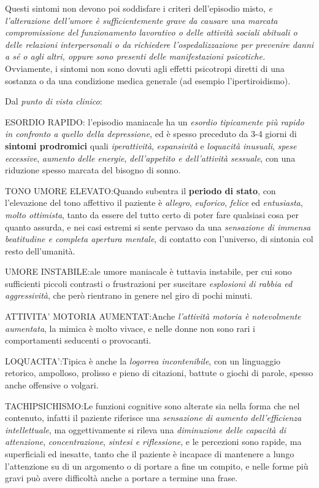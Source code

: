 \begin{itemize}
Questi sintomi non devono poi soddisfare i criteri dell'episodio misto,
\emph{e l'alterazione dell'umore è sufficientemente grave da causare una
marcata compromissione del funzionamento lavorativo o delle attività
sociali abituali o delle relazioni interpersonali o da richiedere
l'ospedalizzazione per prevenire danni a sé o agli altri, oppure sono
presenti delle manifestazioni psicotiche.} Ovviamente, i sintomi non
sono dovuti agli effetti psicotropi diretti di una sostanza o da una
condizione medica generale (ad esempio l'ipertiroidismo).

Dal \emph{punto di vista clinico}:

ESORDIO RAPIDO: l'episodio maniacale ha un \emph{esordio tipicamente più
rapido in confronto a quello della depressione,} ed è spesso preceduto
da 3-4 giorni di \textbf{sintomi prodromici} quali \emph{iperattività},
\emph{espansività} e \emph{loquacità inusuali}, \emph{spese eccessive},
\emph{aumento delle energie}, \emph{dell'appetito e dell'attività
sessuale}, con una riduzione spesso marcata del bisogno di sonno.

TONO UMORE ELEVATO:Quando subentra il \textbf{periodo di stato}, con
l'elevazione del tono affettivo il paziente è \emph{allegro},
\emph{euforico}, \emph{felice} ed \emph{entusiasta}, \emph{molto
ottimista}, tanto da essere del tutto certo di poter fare qualsiasi cosa
per quanto assurda, e nei casi estremi si sente pervaso da una
\emph{sensazione di immensa beatitudine e completa apertura mentale}, di
contatto con l'universo, di sintonia col resto dell'umanità.

UMORE INSTABILE:ale umore maniacale è tuttavia instabile, per cui sono
sufficienti piccoli contrasti o frustrazioni per suscitare
\emph{esplosioni di rabbia ed aggressività}, che però rientrano in
genere nel giro di pochi minuti.

ATTIVITA' MOTORIA AUMENTAT:Anche \emph{l'attività motoria è notevolmente
aumentata}, la mimica è molto vivace, e nelle donne non sono rari i
comportamenti seducenti o provocanti.

LOQUACITA':Tipica è anche la \emph{logorrea incontenibile}, con un
linguaggio retorico, ampolloso, prolisso e pieno di citazioni, battute o
giochi di parole, spesso anche offensive o volgari.

TACHIPSICHISMO:Le funzioni cognitive sono alterate sia nella forma che
nel contenuto, infatti il paziente riferisce una \emph{sensazione di
aumento dell'efficienza intellettuale}, ma oggettivamente si rileva una
\emph{diminuzione delle capacità di attenzione}, \emph{concentrazione},
\emph{sintesi e riflessione}, e le percezioni sono rapide, ma
superficiali ed inesatte, tanto che il paziente è incapace di mantenere
a lungo l'attenzione su di un argomento o di portare a fine un compito,
e nelle forme più gravi può avere difficoltà anche a portare a termine
una frase.


\end{itemize}
